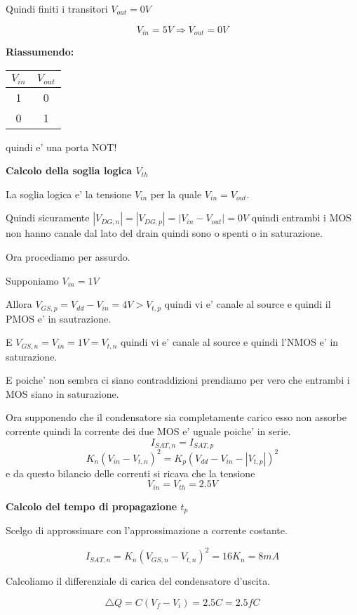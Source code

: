 \documentclass[\main/main.tex]{subfiles}
\begin{document}
Quindi finiti i transitori $V_{out} = 0V$

\[V_{in} = 5V \Rightarrow V_{out} = 0V\]

\textbf{Riassumendo:}
\begin{center}
	\begin{tabular}{ c | c }
		$V_{in}$ & $V_{out}$ \\
		\hline
		1        & 0         \\
		0        & 1         \\
	\end{tabular}
\end{center}
quindi e' una porta NOT!


\clearpage
\textbf{Calcolo della soglia logica $V_{th}$}

La soglia logica e' la tensione $V_{in}$ per la quale $V_{in} = V_{out}$.

Quindi sicuramente $|V_{DG,n}| = |V_{DG,p}| = |V_{in} - V_{out}| = 0V$ quindi entrambi i MOS non hanno canale dal lato del drain quindi sono o spenti o in saturazione.

Ora procediamo per assurdo.

Supponiamo $V_{in} = 1V$

Allora $V_{GS,p} = V_{dd} - V_{in} = 4V > V_{t,p}$ quindi vi e' canale al source e quindi il PMOS e' in sautrazione.

E $V_{GS,n} = V_{in} = 1V = V_{t,n}$ quindi vi e' canale al source e quindi l'NMOS e' in saturazione.

E poiche' non sembra ci siano contraddizioni prendiamo per vero che entrambi i MOS siano in saturazione.

Ora supponendo che il condensatore sia completamente carico esso non assorbe corrente quindi la corrente dei due MOS e' uguale poiche' in serie.
\[I_{SAT,n} = I_{SAT,p}\]
\[K_n \left(V_{in} - V_{t,n} \right )^2 = K_p \left(V_{dd} - V_{in} - |V_{t,p}| \right )^2\]
e da questo bilancio delle correnti si ricava che la tensione
\[V_{in} = V_{th} = 2.5V\]

\textbf{Calcolo del tempo di propagazione $t_p$}

Scelgo di approssimare con l'approssimazione a corrente costante.

\[I_{SAT,n} = K_n \left( V_{GS,n} - V_{t,n} \right)^2 = 16 K_n = 8mA\]

Calcoliamo il differenziale di carica del condensatore d'uscita.

\[ \triangle Q = C \left( V_f  - V_i\right) = 2.5 C = 2.5 fC\]
\end{document}
